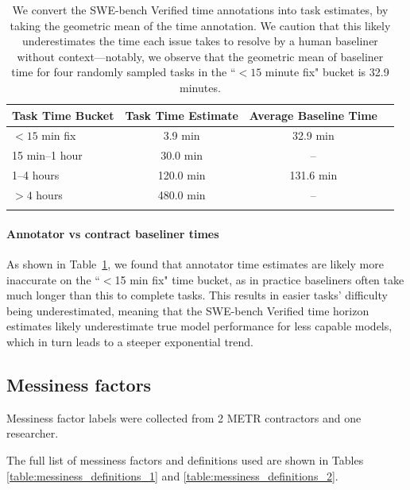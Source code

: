 \documentclass{article}
\begin{document}
\begin{table}[t]
\centering
\begin{tabular}{lccc}
\textbf{Task Time Bucket} & \textbf{Task Time Estimate} & \textbf{Average Baseline Time} \\
\hline
$<15$ min fix & 3.9 min & 32.9 min \\
15 min--1 hour & 30.0 min & --\\ %
1--4 hours & 120.0 min & 131.6 min \\
$>4$ hours & 480.0 min & -- \\
\hline\\
\end{tabular}
\caption{We convert the SWE-bench Verified time annotations into task estimates, by taking the geometric mean of the time annotation. We caution that this likely underestimates the time each issue takes to resolve by a human baseliner without context---notably, we observe that the geometric mean of baseliner time for four randomly sampled tasks in the ``$<15$ minute fix" bucket is 32.9 minutes.
\label{tab:swe-bench-times}}
\end{table}

\paragraph{Annotator vs contract baseliner times} As shown in Table~\ref{tab:swe-bench-times}, we found that annotator time estimates are likely more inaccurate on the ``$<$15 min fix" time bucket, as in practice baseliners often take much longer than this to complete tasks. 
This results in easier tasks' difficulty being underestimated, meaning that the SWE-bench Verified time horizon estimates likely underestimate true model performance for less capable models, which in turn leads to a steeper exponential trend. 




\subsection{Messiness factors} \label{app:messiness}

Messiness factor labels were collected from 2 METR contractors and one researcher. 

 The full list of messiness factors and definitions used are shown in Tables \ref{table:messiness_definitions_1} and \ref{table:messiness_definitions_2}.
\end{document}
